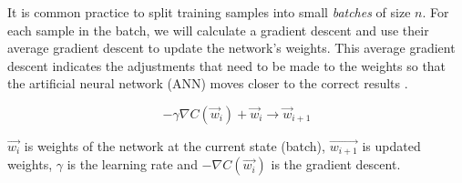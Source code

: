 It is common practice to split training samples into small \textit{batches} of size $n$. For each sample in the batch, we will calculate a gradient descent and use their average gradient descent to update the network's weights. This average gradient descent indicates the adjustments that need to be made to the weights so that the artificial neural network (ANN) moves closer to the correct results \cite{birlliantbackprop}.

\begin{equation}
    {- \gamma \nabla C(\vec{w}_i) + \vec{w}_i \rightarrow \vec{w}_{i+1} }
\end{equation}

$\vec{w_i}$ is weights of the network at the current state (batch), $\vec{w_{i+1}}$ is updated weights, $\gamma$ is the learning rate and $-\nabla C(\vec{w_i})$ is the gradient descent.
